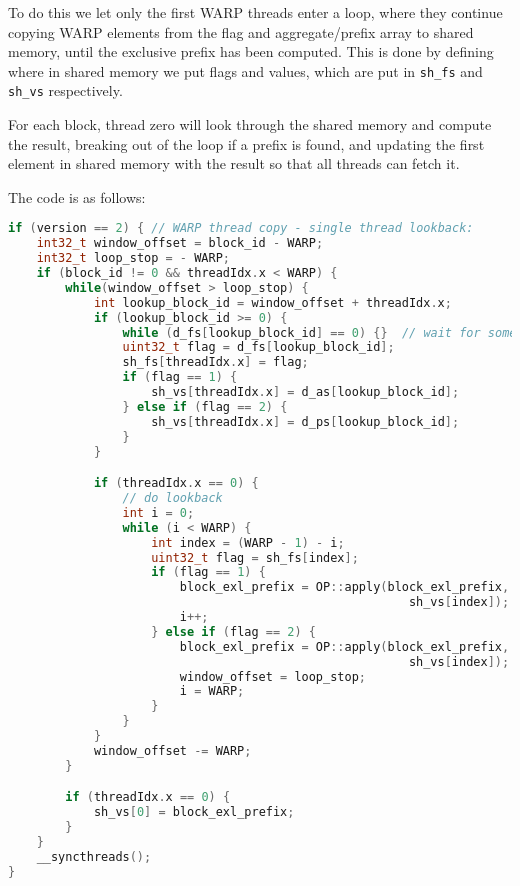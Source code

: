 To do this we let only the first WARP threads enter a loop, where they continue copying WARP elements from the flag and aggregate/prefix array to shared memory, until the exclusive prefix has been computed.
This is done by defining where in shared memory we put flags and values, which are put in \texttt{sh_fs} and \texttt{sh_vs} respectively.

For each block, thread zero will look through the shared memory and compute the result, breaking out of the loop if a prefix is found, and updating the first element in shared memory with the result so that all threads can fetch it.

The code is as follows:
\begin{lstlisting}[language=c++]
if (version == 2) { // WARP thread copy - single thread lookback:
    int32_t window_offset = block_id - WARP;
    int32_t loop_stop = - WARP;
    if (block_id != 0 && threadIdx.x < WARP) {
        while(window_offset > loop_stop) {
            int lookup_block_id = window_offset + threadIdx.x;
            if (lookup_block_id >= 0) {
                while (d_fs[lookup_block_id] == 0) {}  // wait for some result
                uint32_t flag = d_fs[lookup_block_id];
                sh_fs[threadIdx.x] = flag;
                if (flag == 1) {
                    sh_vs[threadIdx.x] = d_as[lookup_block_id];
                } else if (flag == 2) {
                    sh_vs[threadIdx.x] = d_ps[lookup_block_id];
                }
            }

            if (threadIdx.x == 0) {
                // do lookback
                int i = 0;
                while (i < WARP) {
                    int index = (WARP - 1) - i;
                    uint32_t flag = sh_fs[index];
                    if (flag == 1) {
                        block_exl_prefix = OP::apply(block_exl_prefix,
                                                        sh_vs[index]);
                        i++;
                    } else if (flag == 2) {
                        block_exl_prefix = OP::apply(block_exl_prefix,
                                                        sh_vs[index]);
                        window_offset = loop_stop;
                        i = WARP;
                    }
                }
            }
            window_offset -= WARP;
        }

        if (threadIdx.x == 0) {
            sh_vs[0] = block_exl_prefix;
        }
    }
    __syncthreads();
}
\end{lstlisting}

